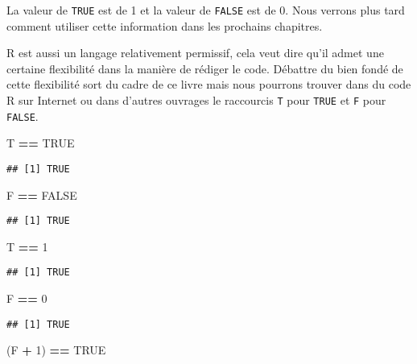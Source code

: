 \documentclass[]{book}
\newenvironment{Shaded}{\begin{snugshade}}{\end{snugshade}}
\newcommand{\DecValTok}[1]{\textcolor[rgb]{0.00,0.00,0.81}{#1}}
\newcommand{\StringTok}[1]{\textcolor[rgb]{0.31,0.60,0.02}{#1}}
\newcommand{\OtherTok}[1]{\textcolor[rgb]{0.56,0.35,0.01}{#1}}
\newcommand{\OperatorTok}[1]{\textcolor[rgb]{0.81,0.36,0.00}{\textbf{#1}}}
\newcommand{\NormalTok}[1]{#1}
\theoremstyle{definition}
\theoremstyle{definition}
\theoremstyle{definition}
\theoremstyle{remark}
\begin{document}
La valeur de \texttt{TRUE} est de 1 et la valeur de \texttt{FALSE} est
de 0. Nous verrons plus tard comment utiliser cette information dans les
prochains chapitres.

R est aussi un langage relativement permissif, cela veut dire qu'il
admet une certaine flexibilité dans la manière de rédiger le code.
Débattre du bien fondé de cette flexibilité sort du cadre de ce livre
mais nous pourrons trouver dans du code R sur Internet ou dans d'autres
ouvrages le raccourcis \texttt{T} pour \texttt{TRUE} et \texttt{F} pour
\texttt{FALSE}.

\begin{Shaded}
\begin{Highlighting}[]
\NormalTok{T }\OperatorTok{==}\StringTok{ }\OtherTok{TRUE}
\end{Highlighting}
\end{Shaded}

\begin{verbatim}
## [1] TRUE
\end{verbatim}

\begin{Shaded}
\begin{Highlighting}[]
\NormalTok{F }\OperatorTok{==}\StringTok{ }\OtherTok{FALSE}
\end{Highlighting}
\end{Shaded}

\begin{verbatim}
## [1] TRUE
\end{verbatim}

\begin{Shaded}
\begin{Highlighting}[]
\NormalTok{T }\OperatorTok{==}\StringTok{ }\DecValTok{1}
\end{Highlighting}
\end{Shaded}

\begin{verbatim}
## [1] TRUE
\end{verbatim}

\begin{Shaded}
\begin{Highlighting}[]
\NormalTok{F }\OperatorTok{==}\StringTok{ }\DecValTok{0}
\end{Highlighting}
\end{Shaded}

\begin{verbatim}
## [1] TRUE
\end{verbatim}

\begin{Shaded}
\begin{Highlighting}[]
\NormalTok{(F }\OperatorTok{+}\StringTok{ }\DecValTok{1}\NormalTok{) }\OperatorTok{==}\StringTok{ }\OtherTok{TRUE}
\end{Highlighting}
\end{Shaded}
\end{document}
